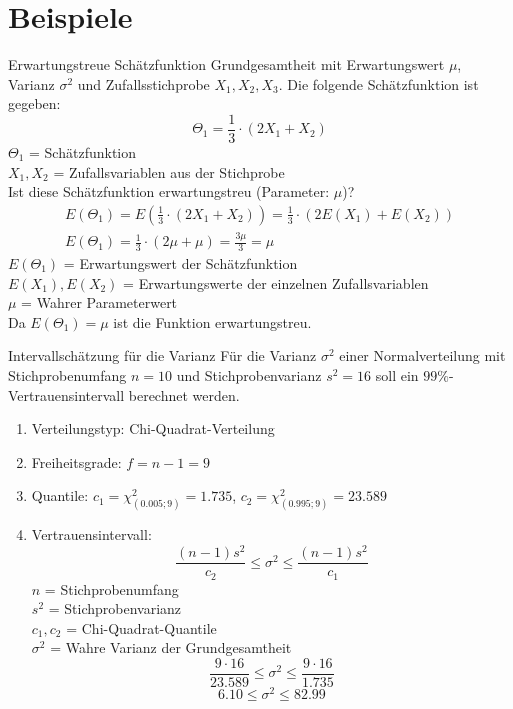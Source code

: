 \section{Beispiele}

\begin{example}{Erwartungstreue Schätzfunktion}
Grundgesamtheit mit Erwartungswert $\mu$, Varianz $\sigma^2$ und Zufallsstichprobe $X_1, X_2, X_3$. Die folgende Schätzfunktion ist gegeben:
$$
\Theta_1=\frac{1}{3} \cdot(2X_1+X_2)
$$
$\Theta_1$ = Schätzfunktion\\
$X_1, X_2$ = Zufallsvariablen aus der Stichprobe\\

Ist diese Schätzfunktion erwartungstreu (Parameter: $\mu$)?
$$
\begin{gathered}
E(\Theta_1)=E(\frac{1}{3} \cdot(2X_1+X_2))=\frac{1}{3} \cdot(2E(X_1)+E(X_2)) \\
E(\Theta_1)=\frac{1}{3} \cdot(2\mu+\mu)=\frac{3\mu}{3}=\mu
\end{gathered}
$$
$E(\Theta_1)$ = Erwartungswert der Schätzfunktion\\
$E(X_1), E(X_2)$ = Erwartungswerte der einzelnen Zufallsvariablen\\
$\mu$ = Wahrer Parameterwert\\

Da $E(\Theta_1)=\mu$ ist die Funktion erwartungstreu.
\end{example}

\begin{example}{Intervallschätzung für die Varianz} Für die Varianz $\sigma^2$ einer Normalverteilung mit Stichprobenumfang $n=10$ und Stichprobenvarianz $s^2=16$ soll ein $99\%$-Vertrauensintervall berechnet werden.

\begin{enumerate}
  \item Verteilungstyp: Chi-Quadrat-Verteilung
  \item Freiheitsgrade: $f=n-1=9$
  \item Quantile: $c_1=\chi^2_{(0.005;9)}=1.735$, $c_2=\chi^2_{(0.995;9)}=23.589$
  \item Vertrauensintervall:
  $$
  \frac{(n-1)s^2}{c_2} \leq \sigma^2 \leq \frac{(n-1)s^2}{c_1}
  $$
  $n$ = Stichprobenumfang\\
  $s^2$ = Stichprobenvarianz\\
  $c_1, c_2$ = Chi-Quadrat-Quantile\\
  $\sigma^2$ = Wahre Varianz der Grundgesamtheit\\
  $$
  \frac{9 \cdot 16}{23.589} \leq \sigma^2 \leq \frac{9 \cdot 16}{1.735}
  $$
  $$
  6.10 \leq \sigma^2 \leq 82.99
  $$
\end{enumerate}
\end{example}

